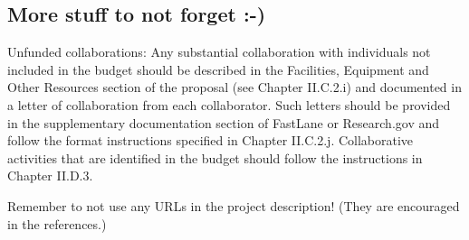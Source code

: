 %

\subsection{More stuff to not forget :-)}

Unfunded collaborations: Any substantial collaboration with individuals not included in the budget should be described in the Facilities, Equipment and Other Resources section of the proposal (see Chapter II.C.2.i) and documented in a letter of collaboration from each collaborator. Such letters should be provided in the supplementary documentation section of FastLane or Research.gov and follow the format instructions specified in Chapter II.C.2.j. Collaborative activities that are identified in the budget should follow the instructions in Chapter II.D.3.

Remember to not use any URLs in the project description!  (They are
encouraged in the references.)
